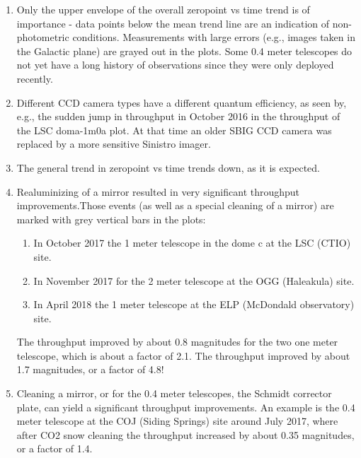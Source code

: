 \documentclass[draft]{spieman}
\begin{document}
\begin{enumerate}

\item Only the upper envelope of the overall zeropoint vs time trend is of importance - data points
below the mean trend line are an indication of non-photometric conditions. Measurements with large
errors (e.g., images taken in the Galactic plane) are grayed out in the plots. Some 0.4 meter 
telescopes do not yet have a long history of observations since they were only deployed recently.

\item Different CCD camera types have a different quantum efficiency, as seen by, e.g., the sudden
jump in throughput in October 2016 in the throughput of the LSC doma-1m0a plot. At that time an
older SBIG CCD camera was replaced by a more sensitive Sinistro imager.

\item The general trend in zeropoint vs time trends down, as it is expected.

\item Realuminizing of a mirror resulted in very significant throughput improvements.Those events 
(as well as a special cleaning of a mirror) are marked with grey vertical bars in the plots:
 \begin{enumerate}
 	\item In October 2017 the 1 meter telescope in the dome c at the LSC (CTIO) site.
    \item In November 2017 for the 2 meter telescope at the OGG (Haleakula) site. 
    \item In April 2018 the 1 meter telescope at the ELP  (McDondald observatory) site.
\end{enumerate}
 The throughput improved by about 0.8 magnitudes for the two one meter telescope, which is about a 
 factor of 2.1. The throughput improved by about 1.7 magnitudes, or a factor of 4.8!

\item Cleaning a mirror, or for the 0.4 meter telescopes, the Schmidt corrector plate, can yield
a significant throughput improvements. An example is the 0.4 meter telescope at the COJ (Siding 
Springs) site around July 2017, where after CO2 snow cleaning the throughput increased by about 
0.35 magnitudes, or a factor of 1.4. 


\end{enumerate}
\end{document}
